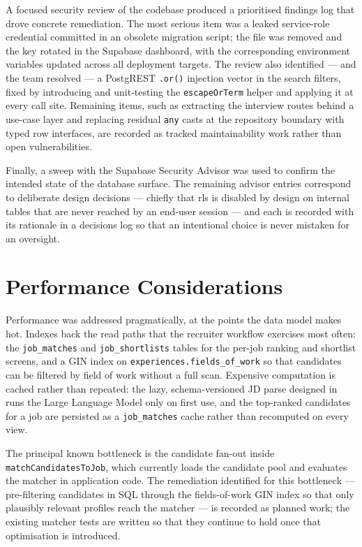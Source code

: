 A focused security review of the codebase produced a prioritised findings log
that drove concrete remediation. The most serious item was a leaked service-role
credential committed in an obsolete migration script; the file was removed
and the key rotated in the Supabase dashboard, with the corresponding
environment variables updated across all deployment targets. The review also
identified --- and the team resolved --- a PostgREST \texttt{.or()} injection
vector in the search filters, fixed by introducing and unit-testing the
\texttt{escapeOrTerm} helper and applying it at every call site. Remaining
items, such as extracting the interview routes behind a use-case layer and
replacing residual \texttt{any} casts at the repository boundary with typed
row interfaces, are recorded as tracked maintainability work rather than
open vulnerabilities.

Finally, a sweep with the Supabase Security Advisor was used to confirm the
intended state of the database surface. The remaining advisor entries
correspond to deliberate design decisions --- chiefly that \gls{rls} is
disabled by design on internal tables that are never reached by an
end-user session --- and each is recorded with its rationale in a decisions
log so that an intentional choice is never mistaken for an oversight.


\section{Performance Considerations}
\label{sec:val-performance}

Performance was addressed pragmatically, at the points the data model makes
hot. Indexes back the read paths that the recruiter workflow exercises most
often: the \texttt{job\_matches} and \texttt{job\_shortlists} tables for the
per-job ranking and shortlist screens, and a GIN index on
\texttt{experiences.fields\_of\_work} so that candidates can be filtered by
field of work without a full scan. Expensive computation is cached rather
than repeated: the lazy, schema-versioned JD parse designed in
 runs the Large Language Model only on first use, and the
top-ranked candidates for a job are persisted as a \texttt{job\_matches} cache
rather than recomputed on every view.

The principal known bottleneck is the candidate fan-out inside
\texttt{matchCandidatesToJob}, which currently loads the candidate pool and
evaluates the matcher in application code. The remediation identified for this
bottleneck --- pre-filtering candidates in SQL through the fields-of-work GIN
index so that only plausibly relevant profiles reach the matcher --- is
recorded as planned work; the existing matcher tests are written so that
they continue to hold once that optimisation is introduced.

